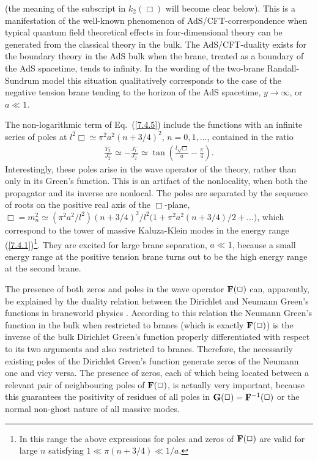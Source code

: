 \documentclass[a4paper,preprint,nofootinbib,
                 showpacs,preprintnumbers,amsmath,amssymb]{revtex4}
\begin{document}
(the meaning of the subscript in $k_2(\Box)$ will become 
clear below). This is a manifestation of the well-known phenomenon 
of AdS/CFT-correspondence \cite{AdS/CFT,Gubser,logcoef} when 
typical quantum field theoretical effects in four-dimensional 
theory can be generated from the classical theory in the bulk. The 
AdS/CFT-duality exists for the boundary theory in the AdS bulk when 
the brane, treated as a boundary of the AdS spacetime, tends to 
infinity. In the wording of the two-brane Randall-Sundrum 
model \cite{Gubser,brane} this situation qualitatively corresponds 
to the case of the negative tension brane tending to the horizon 
of the AdS spacetime, $y\to\infty$, or $a\ll 1$. 
 
The non-logarithmic term of Eq.~(\ref{7.4.5}) include the 
functions with an infinite series of poles at  
$l^2\Box\simeq\pi^2 a^2(n+3/4)^2$, $n=0,1,...$, contained in the ratio 
    \begin{eqnarray} 
    \frac{Y_2^-}{J_2^-}\simeq 
    -\frac{J_1^-}{J_2^-}\simeq 
    \tan\left(\frac{l\sqrt\Box}a 
    -\frac\pi4\right).              \label{7.4.6} 
    \end{eqnarray} 
Interestingly, these poles arise in the wave operator of the 
theory, rather than only in its Green's function. This is an 
artifact of the nonlocality, when both the propagator and its inverse 
are nonlocal. The poles are separated by the sequence of roots on the  
positive real axis of the $\Box$-plane,  
$\Box=m_n^2\simeq(\pi^2a^2/l^2)(n+3/4)^2/l^2\big(1 
+\pi^2a^2(n+3/4)/2+...\big)$, 
which correspond to the tower of massive Kaluza-Klein modes in the  
energy range (\ref{7.4.1})\footnote{In this range the above expressions 
for poles and zeros of ${\bf F}(\Box)$ are valid for large $n$ satisfying 
$1\ll\pi(n+3/4)\ll 1/a$.}. They are excited for large brane separation,  
$a\ll 1$, because a small energy range at the positive tension brane  
turns out to be the high energy range at the second brane.  
 
The presence 
of both zeros and poles in the wave operator ${\bf F}(\Box)$ can, 
apparently, be explained by the duality relation between the Dirichlet 
and Neumann Green's functions in braneworld physics \cite{duality}.  
According to this relation the Neumann Green's function in the bulk  
when restricted to branes (which is exactly ${\bf F}(\Box)$) is the  
inverse of the bulk Dirichlet Green's function properly differentiated  
with respect to its two arguments and also restricted to branes. Therefore, 
the necessarily existing poles of the Dirichlet Green's function generate  
zeros of the Neumann one and vicy versa. The presence of zeros, each of 
which being located between a relevant pair of neighbouring poles of  
${\bf F}(\Box)$, is actually very important, because this guarantees the 
positivity of residues of all poles in ${\bf G}(\Box)={\bf F}^{-1}(\Box)$ 
or the normal non-ghost nature of all massive modes. 
 
\end{document}
